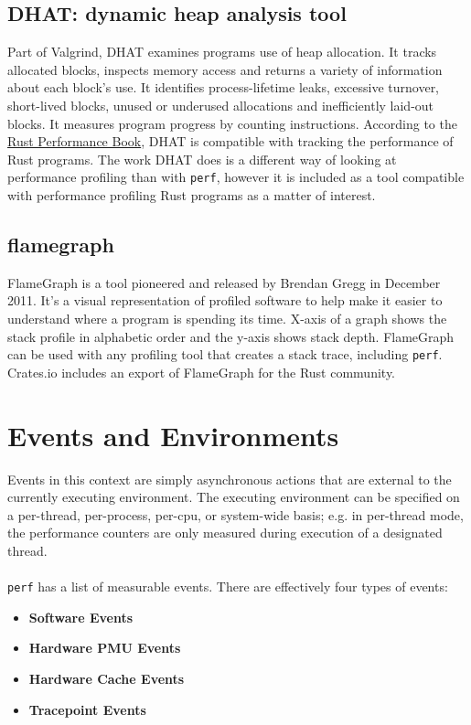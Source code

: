 \documentclass{article}
\begin{document}
\subsection{DHAT: dynamic heap analysis tool}
Part of Valgrind, DHAT examines programs use of heap allocation. It tracks
allocated blocks, inspects memory access and returns a variety of information
about each block's use. It identifies process-lifetime leaks, excessive
turnover, short-lived blocks, unused or underused allocations and inefficiently
laid-out blocks. It measures program progress by counting instructions.
According to the \underline{Rust Performance Book}, DHAT is compatible with
tracking the performance of Rust programs. The work DHAT does is a different way
of looking at performance profiling than with \texttt{perf}, however it is
included as a tool compatible with performance profiling Rust programs as a
matter of interest.
\subsection{flamegraph}
FlameGraph is a tool pioneered and released by Brendan Gregg in December 2011.
It's a visual representation of profiled software to help make it easier to
understand where a program is spending its time. X-axis of a graph shows the
stack profile in alphabetic order and the y-axis shows stack depth. FlameGraph
can be used with any profiling tool that creates a stack trace, including
\texttt{perf}. Crates.io includes an export of FlameGraph for the Rust community.
\section{Events and Environments}
Events in this context are simply asynchronous actions that are external to the currently executing environment. The executing environment can be specified on a per-thread, per-process, per-cpu, or system-wide basis; e.g. in per-thread mode, the performance counters are only measured during execution of a designated thread. 
\\\\
\texttt{perf} has a list of measurable events. There are effectively four types of events:
\begin{itemize}
    \item \textbf{Software Events}
    \item \textbf{Hardware PMU Events}
    \item \textbf{Hardware Cache Events}
    \item \textbf{Tracepoint Events}
\end{itemize}
\end{document}
